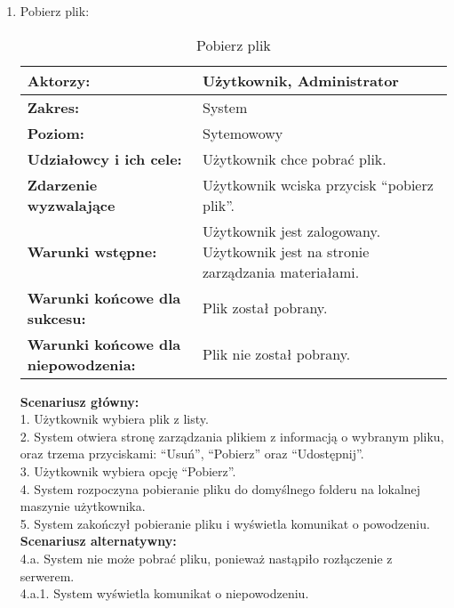 \begin{enumerate}[label=(\Roman*)]
\item Pobierz plik:
	\begin{table}[h]
\centering
\caption{Pobierz plik}
\label{Pobierzplik}
\begin{tabular}{|p{7cm}|p{7cm}|}
  \hline 
  \textbf{Aktorzy:} & Użytkownik, Administrator\\
  \hline
  \textbf{Zakres:} & System \\
	\hline
  \textbf{Poziom:} & Sytemowowy \\
	\hline
  \textbf{Udziałowcy i ich cele: } & Użytkownik chce pobrać plik. \\
	\hline
  \textbf{Zdarzenie wyzwalające } & Użytkownik wciska przycisk “pobierz plik”. \\
	\hline
  \textbf{Warunki wstępne: } & Użytkownik jest zalogowany. Użytkownik jest na stronie zarządzania materiałami.
 \\
	\hline
  \textbf{Warunki końcowe dla sukcesu:} & Plik został pobrany.\\
	\hline
  \textbf{Warunki końcowe dla niepowodzenia:} & Plik nie został pobrany. \\
  \hline
\end{tabular} 
\end{table}

\textbf{Scenariusz główny:}\\
1. Użytkownik wybiera plik z listy.\\
2. System otwiera stronę zarządzania plikiem z informacją o wybranym pliku, oraz trzema przyciskami: “Usuń”, “Pobierz” oraz “Udostępnij”.\\
3. Użytkownik wybiera opcję “Pobierz”.\\
4. System rozpoczyna pobieranie pliku do domyślnego folderu na lokalnej maszynie użytkownika.\\
5. System zakończył pobieranie pliku i wyświetla komunikat o powodzeniu.\\
\textbf{Scenariusz alternatywny:}\\
4.a. System nie może pobrać pliku, ponieważ nastąpiło rozłączenie z serwerem.\\
4.a.1. System wyświetla komunikat o niepowodzeniu.\\


\end{enumerate}
